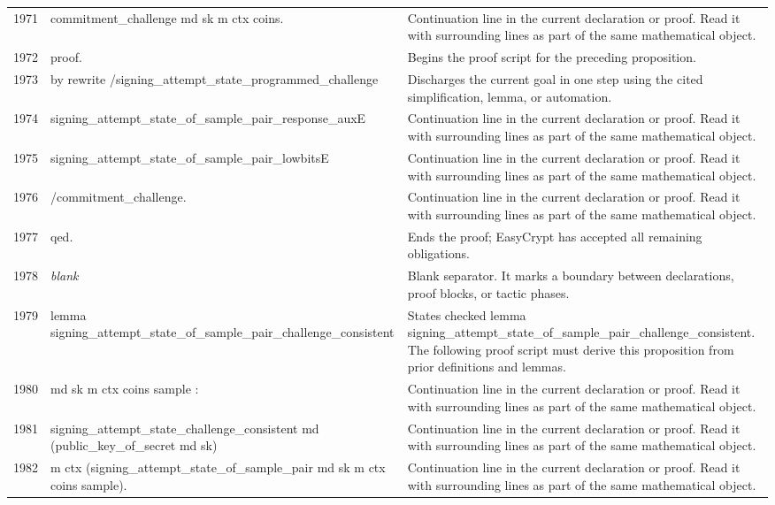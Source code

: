 \documentclass[10pt]{article}
\begin{document}
\begin{longtable}{r L{0.53\textwidth} L{0.37\textwidth}}
1971 & {\ttfamily\scriptsize   commitment\_challenge md sk m ctx coins.} & Continuation line in the current declaration or proof.  Read it with surrounding lines as part of the same mathematical object. \\
1972 & {\ttfamily\scriptsize proof.} & Begins the proof script for the preceding proposition. \\
1973 & {\ttfamily\scriptsize by rewrite /signing\_attempt\_state\_programmed\_challenge} & Discharges the current goal in one step using the cited simplification, lemma, or automation. \\
1974 & {\ttfamily\scriptsize            signing\_attempt\_state\_of\_sample\_pair\_response\_auxE} & Continuation line in the current declaration or proof.  Read it with surrounding lines as part of the same mathematical object. \\
1975 & {\ttfamily\scriptsize            signing\_attempt\_state\_of\_sample\_pair\_lowbitsE} & Continuation line in the current declaration or proof.  Read it with surrounding lines as part of the same mathematical object. \\
1976 & {\ttfamily\scriptsize            /commitment\_challenge.} & Continuation line in the current declaration or proof.  Read it with surrounding lines as part of the same mathematical object. \\
1977 & {\ttfamily\scriptsize qed.} & Ends the proof; EasyCrypt has accepted all remaining obligations. \\
1978 & {\ttfamily\scriptsize \emph{blank}} & Blank separator.  It marks a boundary between declarations, proof blocks, or tactic phases. \\
1979 & {\ttfamily\scriptsize lemma signing\_attempt\_state\_of\_sample\_pair\_challenge\_consistent} & States checked lemma signing\_attempt\_state\_of\_sample\_pair\_challenge\_consistent.  The following proof script must derive this proposition from prior definitions and lemmas. \\
1980 & {\ttfamily\scriptsize    md sk m ctx coins sample :} & Continuation line in the current declaration or proof.  Read it with surrounding lines as part of the same mathematical object. \\
1981 & {\ttfamily\scriptsize   signing\_attempt\_state\_challenge\_consistent md (public\_key\_of\_secret md sk)} & Continuation line in the current declaration or proof.  Read it with surrounding lines as part of the same mathematical object. \\
1982 & {\ttfamily\scriptsize     m ctx (signing\_attempt\_state\_of\_sample\_pair md sk m ctx coins sample).} & Continuation line in the current declaration or proof.  Read it with surrounding lines as part of the same mathematical object. \\

\end{longtable}
\end{document}
